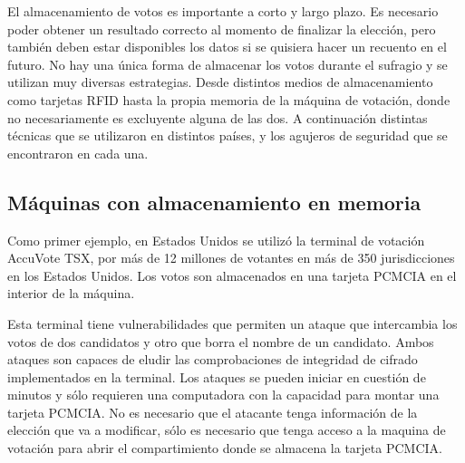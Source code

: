 El almacenamiento de votos es importante a corto y largo plazo. Es necesario poder obtener un resultado correcto al momento de finalizar la elección, pero también deben estar disponibles los datos si se quisiera hacer un recuento en el futuro.
No hay una única forma de almacenar los votos durante el sufragio y se utilizan muy diversas estrategias. Desde distintos medios de almacenamiento como tarjetas RFID hasta la propia memoria de la máquina de votación, donde no necesariamente es excluyente alguna de las dos.
A continuación distintas técnicas que se utilizaron en distintos países, y los agujeros de seguridad que se encontraron en cada una.

\subsection{Máquinas con almacenamiento en memoria}

Como primer ejemplo, en Estados Unidos se utilizó la terminal de votación AccuVote TSX, por más de 12 millones de votantes en más de 350 jurisdicciones en los Estados Unidos. Los votos son almacenados en una tarjeta PCMCIA\cite{davtyan} en el interior de la máquina.

Esta terminal tiene vulnerabilidades que permiten un ataque que intercambia los votos de dos candidatos y otro que borra el nombre de un candidato. Ambos ataques son capaces de eludir las comprobaciones de integridad de cifrado implementados en la terminal. Los ataques se pueden iniciar en cuestión de minutos y sólo requieren una computadora con la capacidad para montar una tarjeta PCMCIA. No es necesario que el atacante tenga información de la elección que va a modificar, sólo es necesario que tenga acceso a la maquina de votación para abrir el compartimiento donde se almacena la tarjeta PCMCIA.

